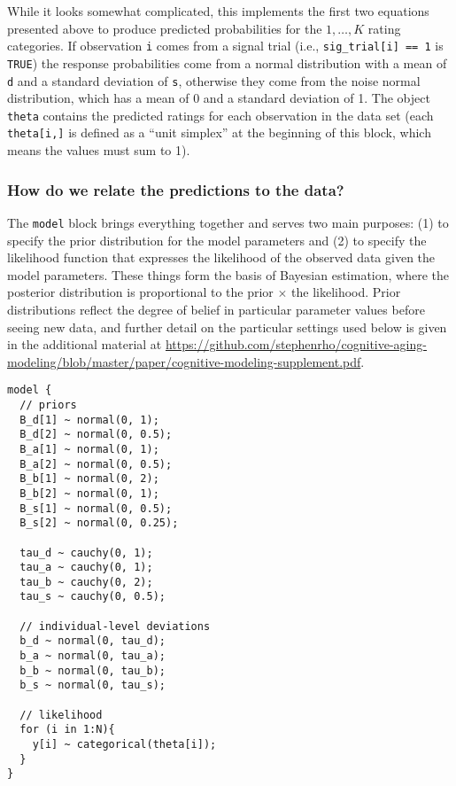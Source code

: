 \documentclass[
  english,
  ,man,floatsintext]{apa6}
\begin{document}
While it looks somewhat complicated, this implements the first two equations presented above to produce predicted probabilities for the \(1,\ldots,K\) rating categories. If observation \texttt{i} comes from a signal trial (i.e., \texttt{sig\_trial{[}i{]}\ ==\ 1} is \texttt{TRUE}) the response probabilities come from a normal distribution with a mean of \texttt{d} and a standard deviation of \texttt{s}, otherwise they come from the noise normal distribution, which has a mean of 0 and a standard deviation of 1. The object \texttt{theta} contains the predicted ratings for each observation in the data set (each \texttt{theta{[}i,{]}} is defined as a \enquote{unit simplex} at the beginning of this block, which means the values must sum to 1).

\hypertarget{how-do-we-relate-the-predictions-to-the-data}{%
\subsubsection{How do we relate the predictions to the data?}\label{how-do-we-relate-the-predictions-to-the-data}}

The \texttt{model} block brings everything together and serves two main purposes: (1) to specify the prior distribution for the model parameters and (2) to specify the likelihood function that expresses the likelihood of the observed data given the model parameters. These things form the basis of Bayesian estimation, where the posterior distribution is proportional to the prior \(\times\) the likelihood. Prior distributions reflect the degree of belief in particular parameter values before seeing new data, and further detail on the particular settings used below is given in the additional material at \url{https://github.com/stephenrho/cognitive-aging-modeling/blob/master/paper/cognitive-modeling-supplement.pdf}.

\begin{verbatim}
model {
  // priors
  B_d[1] ~ normal(0, 1);
  B_d[2] ~ normal(0, 0.5);
  B_a[1] ~ normal(0, 1);
  B_a[2] ~ normal(0, 0.5);
  B_b[1] ~ normal(0, 2);
  B_b[2] ~ normal(0, 1);
  B_s[1] ~ normal(0, 0.5);
  B_s[2] ~ normal(0, 0.25);

  tau_d ~ cauchy(0, 1);
  tau_a ~ cauchy(0, 1);
  tau_b ~ cauchy(0, 2);
  tau_s ~ cauchy(0, 0.5);

  // individual-level deviations
  b_d ~ normal(0, tau_d);
  b_a ~ normal(0, tau_a);
  b_b ~ normal(0, tau_b);
  b_s ~ normal(0, tau_s);

  // likelihood
  for (i in 1:N){
    y[i] ~ categorical(theta[i]);
  }
}
\end{verbatim}
\end{document}
